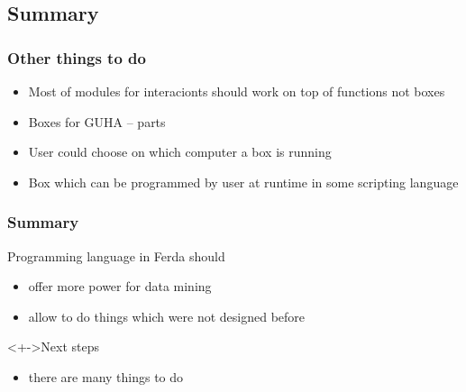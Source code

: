 \documentclass{beamer}
\begin{document}
\subsection{Summary}
\begin{frame}
	\frametitle{Other things to do}
	\begin{block}{}
		\begin{itemize}[<+->]
			\item Most of modules for interacionts should work on top of functions not boxes
			\item Boxes for GUHA -- parts 
			\item User could choose on which computer a box is running
			\item Box which can be programmed by user at runtime in some scripting language
		\end{itemize}
	\end{block}
\end{frame}

\begin{frame}
	\frametitle{Summary}
	\begin{block}{Programming language in Ferda should}
		\begin{itemize}[<+->]
			\item offer more power for data mining
			\item allow to do things which were not designed before
		\end{itemize}
	\end{block}
	\begin{block}<+->{Next steps}
		\begin{itemize}[<+->]
			\item there are many things to do
		\end{itemize}
	\end{block}
\end{frame}
\end{document}
